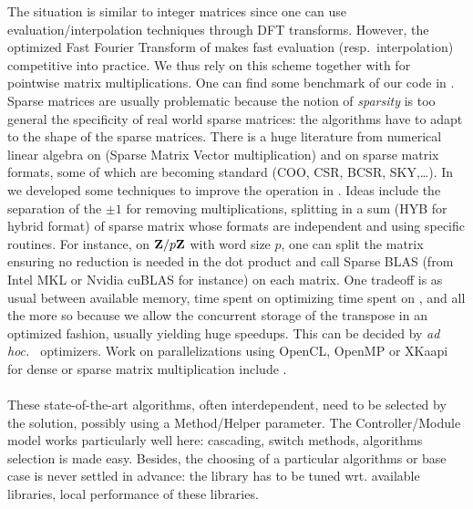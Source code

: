 %
%
The situation is similar to integer matrices since one can use
evaluation/interpolation techniques through DFT transforms. However, the
optimized Fast Fourier Transform of \cite{Harvey:2014}  makes fast evaluation
(resp.\ interpolation) competitive into practice. We thus rely on this scheme
together with \fgemm for pointwise matrix multiplications. One can find some
benchmark of our code in \cite{GioLeb14}.
%
%
Sparse matrices are usually problematic because the notion of \emph{sparsity}
is too general \vs the specificity of real world sparse matrices: the
algorithms have to adapt to the shape of the sparse matrices.
%
There is a huge literature from numerical linear algebra  on \spmv (Sparse
Matrix Vector multiplication) and on sparse matrix formats, some of which are
becoming standard (COO, CSR, BCSR, SKY,\ldots).  In \cite{Boyer:2010:spmv} we
developed some techniques to improve the \spmv operation in \linbox. Ideas
include the separation of the $\pm 1$ for removing multiplications, splitting
in a sum (HYB for hybrid format) of sparse matrix  whose formats are
independent and using specific routines. For instance, on $\mathbf{Z}{/ p\mathbf{Z}}$ with
word size $p$, one can split the matrix ensuring no reduction is needed  in the
dot product and call Sparse BLAS (from Intel \textsf{MKL} or Nvidia
\textsf{cuBLAS} for instance) on each matrix. One tradeoff is as usual between
available memory, time spent on optimizing \vs time spent on \apply, and all
the more so because we allow the concurrent storage of the transpose in an
optimized fashion, usually yielding huge speedups. This can be decided by
\emph{ad hoc.\ } optimizers.
%
Work on parallelizations using \textsf{OpenCL}, \textsf{OpenMP} or
\textsf{XKaapi} for dense or sparse matrix multiplication include
\cite{Boyer:2010:spmv,WST12,DGPZ14}.

\paragraph{}
These state-of-the-art algorithms, often interdependent, need to be selected
by the \mul solution, possibly using a Method/Helper parameter. The
Controller/Module model works particularly well here: cascading, switch
methods, algorithms selection is made easy. Besides, the choosing of a
particular algorithms or base case is never settled in advance: the library has
to be tuned wrt. available libraries, local performance of these libraries.

